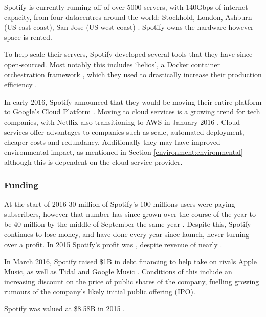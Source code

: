 Spotify is currently running off of over 5000 servers, with 140Gbps of internet capacity, from four datacentres around the world: Stockhold, London, Ashburn (US east coast), San Jose (US west coast) \parencite{Garcia2013}. Spotify owns the hardware however space is rented.

To help scale their servers, Spotify developed several tools that they have since open-sourced. Most notably this includes `helios', a Docker container orchestration framework \parencite{Github2016}, which they used to drastically increase their production efficiency \parencite{Vanlan2015}.

In early 2016, Spotify announced that they would be moving their entire platform to Google's Cloud Platform \parencite{Henderson2016}. Moving to cloud services is a growing trend for tech companies, with Netflix also transitioning to AWS in January 2016 \parencite{Brodkin2016}. Cloud services offer advantages to companies such as scale, automated deployment, cheaper costs and redundancy.  Additionally they may have improved environmental impact, as mentioned in Section \ref{environment:environmental} although this is dependent on the cloud service provider.

\subsubsection{Funding}
At the start of 2016 30 million of Spotify's 100 millions users were paying subscribers, however that number has since grown over the course of the year to be 40 million by the middle of September the same year \parencite{30m_spotify, 40m_spotify}. Despite this, Spotify continues to lose money, and have done every year since launch, never turning over a profit. In 2015 Spotify's profit was , despite revenue of nearly  \parencite{Titcomb2016}.

In March 2016, Spotify raised \$1B in debt financing to help take on rivals Apple Music, as well as Tidal and Google Music \parencite{Reynolds2016}. Conditions of this include an increasing discount on the price of public shares of the company, fuelling growing rumours of the company's likely initial public offering (IPO).

Spotify was valued at \$8.58B in 2015 \parencite{Davidson2015}.